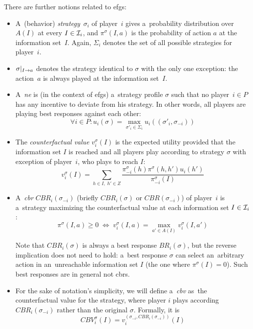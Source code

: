 \noindent
There are further notions related to \acrshort{efg}s:
\begin{itemize}
  \item A~(behavior) \emph{strategy}~$\sigma_i$ of player~$i$ gives a~probability distribution over $A(I)$ at every $I \in \mathcal{I}_i$, and $\pi ^\sigma (I, a)$ is the probability of action $a$ at the information set~$I$.
    Again, $\Sigma_i$ denotes the set of all possible strategies for player~$i$.

  \item $\sigma | _{I \rightarrow a}$ denotes the strategy identical to $\sigma$ with the only one exception:
    the action~$a$ is always played at the information set~$I$.

  \item A~\emph{\acrfull{ne}} is (in the context of \acrshort{efg}s) a~strategy profile $\sigma$ such that no player~$i \in P$ has any incentive to deviate from his strategy.
    In other words, all players are playing best responses against each other:
    \[ \forall i \in P\colon u_i (\sigma) = \max _{\sigma'_i \in \Sigma_i} u_i ((\sigma'_i, \sigma_{-i})) \]

  \item The \emph{counterfactual value} $v _i ^\sigma (I)$ is the expected utility provided that the information set $I$ is reached and all players play according to strategy $\sigma$ with exception of player~$i$, who plays to reach $I$:
    \[ v _i ^\sigma (I) = \sum\limits _{h \in I, \; h' \in Z}
      \frac
      {\pi _{-i} ^\sigma(h) \pi ^\sigma(h,h') u_i(h')}
      {\pi _{-i} ^\sigma (I)} \]

  \item A~\emph{\acrlong{cbr}} $CBR _i (\sigma _{-i})$ (briefly $CBR _i (\sigma)$ or $CBR(\sigma_{-i})$) of player~$i$ is a~strategy maximizing the counterfactual value at each information set $I \in \mathcal{I} _i$:
    \[ \pi ^\sigma (I, a) \geq 0
      \; \Longleftrightarrow \;
      v _i ^\sigma (I, a) = \max _{a' \in A(I)} v _i ^\sigma (I, a') \]

    Note that $CBR _i (\sigma)$ is always a best response $BR _i (\sigma)$, but the reverse implication does not need to hold:
    a~best response $\sigma$ can select an~arbitrary action in an~unreachable information set $I$ (the one where $\pi ^\sigma (I) = 0$).
    Such best responses are in general not \acrlong{cbr}s.

  \item For the sake of notation's simplicity, we will define a~\emph{\acrfull{cbv}} as~the counterfactual value for the strategy, where player $i$ plays according $CBR _i (\sigma _{-i})$ rather than the original $\sigma$.
    Formally, it is
    \[ CBV _i ^\sigma (I) = v _i ^{(\sigma _{-i}, CBR _i (\sigma _{-i} ))} (I) \]


\end{itemize}
